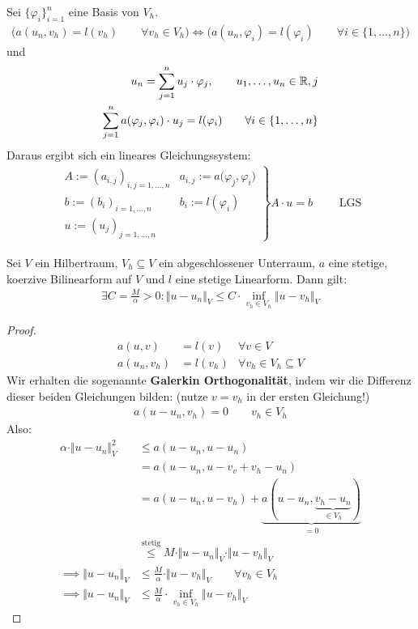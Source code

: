 Sei $\lbrace\varphi_i\rbrace_{i=1}^n$ eine Basis von $V_h$.
\begin{align*}
\Big(a(u_n,v_h)=l(v_h)\qquad\forall v_h\in V_h\Big)\Longleftrightarrow
\Big(a(u_n,\varphi_i)=l(\varphi_i)\qquad\forall i\in\lbrace1,\ldots,n\rbrace\Big)
\end{align*}
und 
\begin{align*}
u_n=\sum\limits_{j=1}^n u_j\cdot\varphi_j,\qquad u_1,\ldots,u_n\in\mathbb{R},j\\
\sum\limits_{j=1}^n a(\varphi_j,\varphi_i)\cdot u_j=l(\varphi_i)\qquad\forall i\in\lbrace1,\ldots,n\rbrace\\
\end{align*}
Daraus ergibt sich ein lineares Gleichungssystem:
\begin{align*}
\left.\begin{array}{ll}
A:=(a_{i,j})_{i,j=1,\ldots,n} &a_{i,j}:=a\big(\varphi_j,\varphi_i\big)\\
b:=(b_i)_{i=1,\ldots,n} &b_i:=l(\varphi_i)\\
u:=(u_j)_{j=1,\ldots,n}
\end{array}\right\rbrace A\cdot u=b\qquad\text{ LGS}
\end{align*}

\begin{theorem}\enter
Sei $V$ ein Hilbertraum, $V_h\subseteq V$ ein abgeschlossener Unterraum, $a$ eine stetige, koerzive Bilinearform auf $V$ und $l$ eine stetige Linearform. Dann gilt:
\begin{align*}
\exists C=\frac{M}{\alpha}>0:\Vert u-u_n\Vert_V\leq C\cdot\inf\limits_{v_h\in V_h}\Vert u-v_h\Vert_V
\end{align*}
\end{theorem}
\begin{proof}
\begin{align*}
a(u,v)&=l(v) &\forall v\in V\\
a(u_n,v_h)&= l(v_h) &\forall v_h\in V_h\subseteq V
\end{align*}
Wir erhalten die sogenannte \textbf{Galerkin Orthogonalität}, indem wir die Differenz dieser beiden Gleichungen bilden: (nutze $v=v_h$ in der ersten Gleichung!) 
\begin{align}\label{eqGalerkinOrthogonalitaet}\tag{GalerkinOrtho}
a(u-u_n,v_h)=0\qquad v_h\in V_h
\end{align}
Also:
\begin{align*}
\alpha\cdot\Vert u-u_n\Vert^2_V
&\leq
a(u-u_n,u-u_n)\\
&=a(u-u_n,u-v_v+v_h- u_n)\\
&=a(u-u_n,u-v_h)+\underbrace{a(u-u_n,\underbrace{v_h-u_n}_{\in V_h})}_{=0}\\
&\stackrel{\text{stetig}}{\leq}
M\cdot\Vert u-u_n\Vert_V\cdot\Vert u-v_h\Vert_V\\
\implies
\Vert u-u_n\Vert_V&\leq\frac{M}{\alpha}\cdot\Vert u-v_h\Vert_V\qquad\forall v_h\in V_h\\
\implies
\Vert u-u_n\Vert_V&\leq \frac{M}{\alpha}\cdot\inf\limits_{v_h\in V_h}\Vert u-v_h\Vert_V
\end{align*}
\end{proof}

